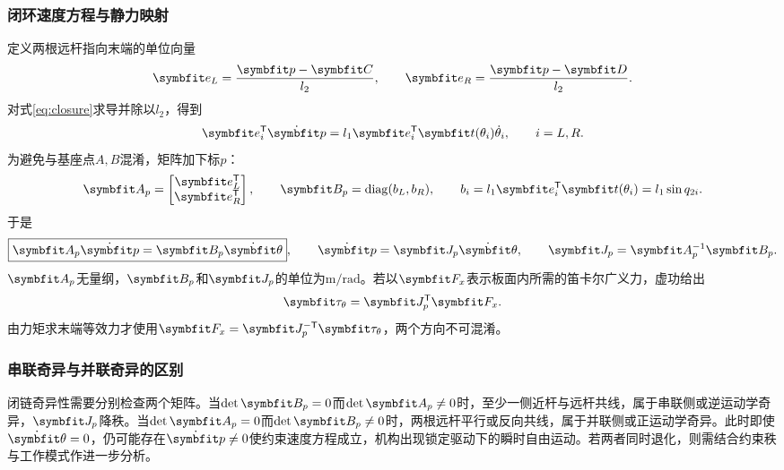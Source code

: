 \subsubsection{闭环速度方程与静力映射}

定义两根远杆指向末端的单位向量
\begin{equation}
\vect e_L=\frac{\vect p-\vect C}{l_2},\qquad
\vect e_R=\frac{\vect p-\vect D}{l_2}.
\end{equation}
对式\eqref{eq:closure}求导并除以$l_2$，得到
\begin{equation}
\vect e_i^\T\dot{\vect p}=l_1\vect e_i^\T\vect t(\theta_i)\dot\theta_i,
\qquad i=L,R.
\end{equation}
为避免与基座点$A,B$混淆，矩阵加下标$p$：
\begin{equation}
\vect A_p=\begin{bmatrix}\vect e_L^\T\\\vect e_R^\T\end{bmatrix},\qquad
\vect B_p=\operatorname{diag}(b_L,b_R),\qquad
b_i=l_1\vect e_i^\T\vect t(\theta_i)=l_1\sin q_{2i}.
\end{equation}
于是
\begin{equation}
\boxed{\vect A_p\dot{\vect p}=\vect B_p\dot{\vect\theta}},\qquad
\dot{\vect p}=\vect J_p\dot{\vect\theta},\qquad
\vect J_p=\vect A_p^{-1}\vect B_p.
\label{eq:parallel_jac}
\end{equation}
$\vect A_p$无量纲，$\vect B_p$和$\vect J_p$的单位为$\mathrm{m/rad}$。若以$\vect F_x$表示板面内所需的笛卡尔广义力，虚功给出
\begin{equation}
\vect\tau_\theta=\vect J_p^\T\vect F_x.
\label{eq:parallel_virtual}
\end{equation}
由力矩求末端等效力才使用$\vect F_x=\vect J_p^{-\T}\vect\tau_\theta$，两个方向不可混淆。

\subsubsection{串联奇异与并联奇异的区别}

闭链奇异性需要分别检查两个矩阵\cite{gosselin1990}。当$\det\vect B_p=0$而$\det\vect A_p\neq0$时，至少一侧近杆与远杆共线，属于串联侧或逆运动学奇异，$\vect J_p$降秩。当$\det\vect A_p=0$而$\det\vect B_p\neq0$时，两根远杆平行或反向共线，属于并联侧或正运动学奇异。此时即使$\dot{\vect\theta}=0$，仍可能存在$\dot{\vect p}\neq0$使约束速度方程成立，机构出现锁定驱动下的瞬时自由运动。若两者同时退化，则需结合约束秩与工作模式作进一步分析。

